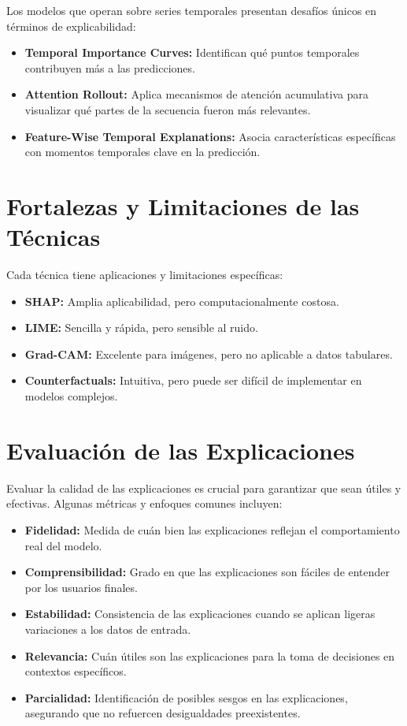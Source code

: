 \begin{refsection}
Los modelos que operan sobre series temporales presentan desafíos únicos en términos de explicabilidad:
\begin{itemize}
    \item \textbf{Temporal Importance Curves:} Identifican qué puntos temporales contribuyen más a las predicciones.
    \item \textbf{Attention Rollout:} Aplica mecanismos de atención acumulativa para visualizar qué partes de la secuencia fueron más relevantes.
    \item \textbf{Feature-Wise Temporal Explanations:} Asocia características específicas con momentos temporales clave en la predicción.
\end{itemize}



\section{Fortalezas y Limitaciones de las Técnicas}

Cada técnica tiene aplicaciones y limitaciones específicas:
\begin{itemize}
    \item \textbf{SHAP:} Amplia aplicabilidad, pero computacionalmente costosa.
    \item \textbf{LIME:} Sencilla y rápida, pero sensible al ruido.
    \item \textbf{Grad-CAM:} Excelente para imágenes, pero no aplicable a datos tabulares.
    \item \textbf{Counterfactuals:} Intuitiva, pero puede ser difícil de implementar en modelos complejos.
\end{itemize}


\section{Evaluación de las Explicaciones}
Evaluar la calidad de las explicaciones es crucial para garantizar que sean útiles y efectivas. Algunas métricas y enfoques comunes incluyen:
\begin{itemize}
    \item \textbf{Fidelidad:} Medida de cuán bien las explicaciones reflejan el comportamiento real del modelo.
    \item \textbf{Comprensibilidad:} Grado en que las explicaciones son fáciles de entender por los usuarios finales.
    \item \textbf{Estabilidad:} Consistencia de las explicaciones cuando se aplican ligeras variaciones a los datos de entrada.
    \item \textbf{Relevancia:} Cuán útiles son las explicaciones para la toma de decisiones en contextos específicos.
    \item \textbf{Parcialidad:} Identificación de posibles sesgos en las explicaciones, asegurando que no refuercen desigualdades preexistentes.
\end{itemize}


\end{refsection}
